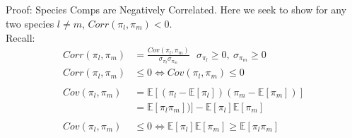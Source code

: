 \documentclass[ xcolor = pdftex, dvipsnames, table ]{beamer}
\begin{document}
\subsection{}
\begin{frame}{Proof: Species Comps are Negatively Correlated.}
	Here we seek to show for any two species $l\neq m$, $Corr(\pi_{l}, \pi_{m})<0$.\\
	Recall:
	\begin{align*}
		Corr(\pi_{l}, \pi_{m}) &= \frac{Cov(\pi_{l}, \pi_{m})}{\sigma_{\pi_{l}}\sigma_{\pi_{m}}} ~~~ \sigma_{\pi_{l}}\ge0,~ \sigma_{\pi_{m}}\ge0 \nonumber\\
		Corr(\pi_{l}, \pi_{m}) &\le 0 \iff Cov(\pi_{l}, \pi_{m}) \le 0 \nonumber\\\nonumber\\
		Cov(\pi_{l}, \pi_{m}) &= \mathbb{E}[(\pi_{l}-\mathbb{E}[\pi_{l}])(\pi_{m}-\mathbb{E}[\pi_{m}])] \nonumber\\ 
		&= \mathbb{E}[\pi_{l}\pi_{m}])] - \mathbb{E}[\pi_{l}]\mathbb{E}[\pi_{m}] \nonumber\\\nonumber\\
		Cov(\pi_{l}, \pi_{m}) &\le0 \iff \mathbb{E}[\pi_{l}]\mathbb{E}[\pi_{m}] \ge \mathbb{E}[\pi_{l}\pi_{m}]
	\end{align*}
\end{frame}

%
%
\end{document}
